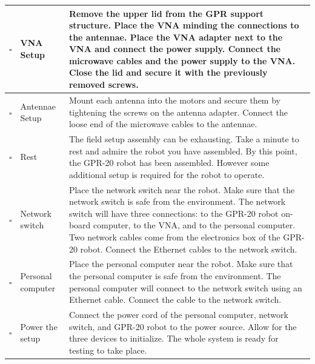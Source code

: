 \documentclass{article}
\begin{document}
\begin{onehalfspacing}
\begin{xltabular}{\textwidth}{|c|p{4cm}|X|}
    $\square$ & VNA Setup & Remove the upper lid from the GPR support structure. Place the VNA minding the connections to the antennae. Place the VNA adapter next to the VNA and connect the power supply. Connect the microwave cables and the power supply to the VNA. Close the lid and secure it with the previously removed screws. \\ \hline
    $\square$ & Antennae Setup & Mount each antenna into the motors and secure them by tightening the screws on the antenna adapter. Connect the loose end of the microwave cables to the antennae.  \\ \hline
    $\square$ & Rest & The field setup assembly can be exhausting. Take a minute to rest and admire the robot you have assembled. By this point, the GPR-20 robot has been assembled. However some additional setup is required for the robot to operate. \\ \hline 
    $\square$ & Network switch & Place the network switch near the robot. Make sure that the network switch is safe from the environment. The network switch will have three connections: to the GPR-20 robot on-board computer, to the VNA, and to the personal computer. Two network cables come from the electronics box of the GPR-20 robot. Connect the Ethernet cables to the network switch.  \\ \hline
    $\square$ & Personal computer & Place the personal computer near the robot. Make sure that the personal computer is safe from the environment. The personal computer will connect to the network switch using an Ethernet cable. Connect the cable to the network switch. \\ \hline
    $\square$ & Power the setup & Connect the power cord of the personal computer, network switch, and GPR-20 robot to the power source. Allow for the three devices to initialize. The whole system is ready for testing to take place. \\ \hline
\end{xltabular}
\end{onehalfspacing}

\newpage
\end{document}

